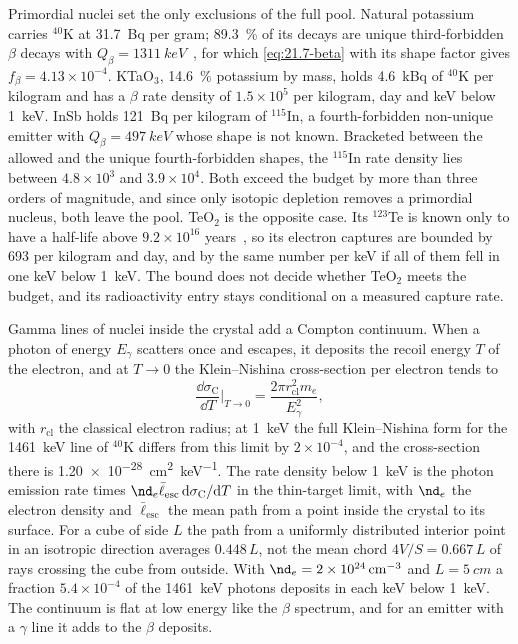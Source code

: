 Primordial nuclei set the only exclusions of the full pool. Natural potassium carries $^{40}$K at \SI{31.7}{Bq} per gram; \SI{89.3}{\percent} of its decays are unique third-forbidden $\beta$ decays with $Q_\beta = \SI{1311}{keV}$~\cite{iaea2026livechart}, for which \cref{eq:21.7-beta} with its shape factor gives $f_\beta = 4.13\times10^{-4}$. KTaO$_3$, \SI{14.6}{\percent} potassium by mass, holds \SI{4.6}{kBq} of $^{40}$K per kilogram and has a $\beta$ rate density of $1.5\times10^5$ per kilogram, day and keV below \SI{1}{keV}. InSb holds \SI{121}{Bq} per kilogram of $^{115}$In, a fourth-forbidden non-unique emitter with $Q_\beta = \SI{497}{keV}$ whose shape is not known. Bracketed between the allowed and the unique fourth-forbidden shapes, the $^{115}$In rate density lies between $4.8\times10^3$ and $3.9\times10^4$. Both exceed the budget by more than three orders of magnitude, and since only isotopic depletion removes a primordial nucleus, both leave the pool. TeO$_2$ is the opposite case. Its $^{123}$Te is known only to have a half-life above $9.2\times10^{16}$ years~\cite{iaea2026livechart}, so its electron captures are bounded by 693 per kilogram and day, and by the same number per keV if all of them fell in one keV below \SI{1}{keV}. The bound does not decide whether TeO$_2$ meets the budget, and its radioactivity entry stays conditional on a measured capture rate.

Gamma lines of nuclei inside the crystal add a Compton continuum. When a photon of energy $E_\gamma$ scatters once and escapes, it deposits the recoil energy $T$ of the electron, and at $T \to 0$ the Klein--Nishina cross-section per electron tends to
\begin{equation}
  \frac{\dd\sigma_{\mathrm{C}}}{\dd T}\bigg|_{T \to 0} = \frac{2\pi r_{\mathrm{cl}}^2m_e}{E_\gamma^2} ,
  \label{eq:21.7-compton}
\end{equation}
with $r_{\mathrm{cl}}$ the classical electron radius; at \SI{1}{keV} the full Klein--Nishina form for the \SI{1461}{keV} line of $^{40}$K differs from this limit by $2\times10^{-4}$, and the cross-section there is \SI{1.20e-28}{cm^2.keV^{-1}}. The rate density below \SI{1}{keV} is the photon emission rate times $\nd_e\bar\ell_{\mathrm{esc}}\,\dd\sigma_{\mathrm{C}}/\dd T$ in the thin-target limit, with $\nd_e$ the electron density and $\bar\ell_{\mathrm{esc}}$ the mean path from a point inside the crystal to its surface. For a cube of side $L$ the path from a uniformly distributed interior point in an isotropic direction averages $0.448\,L$, not the mean chord $4V/S = 0.667\,L$ of rays crossing the cube from outside. With $\nd_e = \SI{2e24}{cm^{-3}}$ and $L = \SI{5}{cm}$ a fraction $5.4\times10^{-4}$ of the \SI{1461}{keV} photons deposits in each keV below \SI{1}{keV}. The continuum is flat at low energy like the $\beta$ spectrum, and for an emitter with a $\gamma$ line it adds to the $\beta$ deposits.

